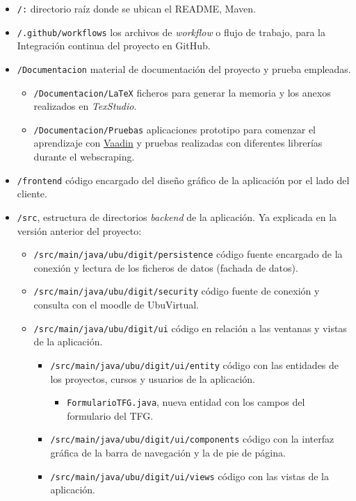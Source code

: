 \begin{itemize}
	\item \texttt{/:} directorio raíz donde se ubican el README, Maven. 
	\item \texttt{/.github/workflows} los archivos de \textit{workflow} o flujo de trabajo, para la Integración continua del proyecto en GitHub.
	\item \texttt{/Documentacion} material de documentación del proyecto y prueba empleadas.
	\begin{itemize}
		\tightlist
		\item \texttt{/Documentacion/LaTeX} ficheros para generar la memoria y los anexos realizados en \emph{TexStudio}.
		\item \texttt{/Documentacion/Pruebas} aplicaciones prototipo para comenzar el aprendizaje con \href{https://vaadin.com/}{Vaadin} y pruebas realizadas con diferentes librerías durante el webscraping.
	\end{itemize}
	\item \texttt{/frontend} código encargado del diseño gráfico de la aplicación por el lado del cliente.
	\item \texttt{/src}, estructura de directorios \emph{backend} de la aplicación. Ya explicada en la versión anterior del proyecto:
		\begin{itemize}
			\item \texttt{/src/main/java/ubu/digit/persistence} código fuente encargado de la conexión y lectura de los ficheros de datos (fachada de datos).		
			\item \texttt{/src/main/java/ubu/digit/security} código fuente de conexión y consulta con el moodle de UbuVirtual.
			\item \texttt{/src/main/java/ubu/digit/ui} código en relación a las ventanas y vistas de la aplicación.
			\begin{itemize}
				\item \texttt{/src/main/java/ubu/digit/ui/entity} código con las entidades de los proyectos, cursos y usuarios de la aplicación.
					\begin{itemize}		
						\item \texttt{FormularioTFG.java}, nueva entidad con los campos del formulario del TFG.
					\end{itemize}
				\item \texttt{/src/main/java/ubu/digit/ui/components} código con la interfaz gráfica de la barra de navegación y la de pie de página.
				\item \texttt{/src/main/java/ubu/digit/ui/views} código con las vistas de la aplicación.

\end{itemize}
\end{itemize}
\end{itemize}
